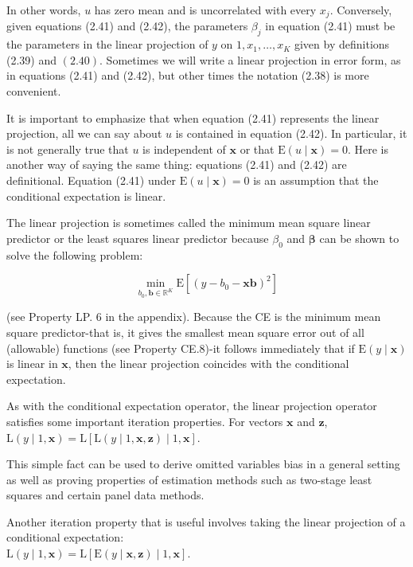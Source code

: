 \documentclass[10pt]{article}
\begin{document}
In other words, $u$ has zero mean and is uncorrelated with every $x_{j}$. Conversely, given equations (2.41) and (2.42), the parameters $\beta_{j}$ in equation (2.41) must be the parameters in the linear projection of $y$ on $1, x_{1}, \ldots, x_{K}$ given by definitions (2.39) and $(2.40)$. Sometimes we will write a linear projection in error form, as in equations (2.41) and (2.42), but other times the notation (2.38) is more convenient.

It is important to emphasize that when equation (2.41) represents the linear projection, all we can say about $u$ is contained in equation (2.42). In particular, it is not generally true that $u$ is independent of $\mathbf{x}$ or that $\mathrm{E}(u \mid \mathbf{x})=0$. Here is another way of saying the same thing: equations (2.41) and (2.42) are definitional. Equation (2.41) under $\mathrm{E}(u \mid \mathbf{x})=0$ is an assumption that the conditional expectation is linear.

The linear projection is sometimes called the minimum mean square linear predictor or the least squares linear predictor because $\beta_{0}$ and $\boldsymbol{\beta}$ can be shown to solve the following problem:


\begin{equation*}
\min _{b_{0}, \mathbf{b} \in \mathbb{R}^{K}} \mathrm{E}\left[\left(y-b_{0}-\mathbf{x b}\right)^{2}\right] \tag{2.43}
\end{equation*}


(see Property LP. 6 in the appendix). Because the CE is the minimum mean square predictor-that is, it gives the smallest mean square error out of all (allowable) functions (see Property CE.8)-it follows immediately that if $\mathrm{E}(y \mid \mathbf{x})$ is linear in $\mathbf{x}$, then the linear projection coincides with the conditional expectation.

As with the conditional expectation operator, the linear projection operator satisfies some important iteration properties. For vectors $\mathbf{x}$ and $\mathbf{z}$,\\
$\mathrm{L}(y \mid 1, \mathbf{x})=\mathrm{L}[\mathrm{L}(y \mid 1, \mathbf{x}, \mathbf{z}) \mid 1, \mathbf{x}]$.

This simple fact can be used to derive omitted variables bias in a general setting as well as proving properties of estimation methods such as two-stage least squares and certain panel data methods.

Another iteration property that is useful involves taking the linear projection of a conditional expectation:\\
$\mathrm{L}(y \mid 1, \mathbf{x})=\mathrm{L}[\mathrm{E}(y \mid \mathbf{x}, \mathbf{z}) \mid 1, \mathbf{x}]$.
\end{document}
